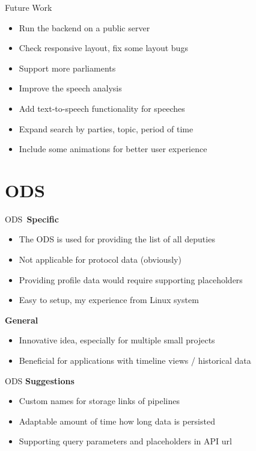\documentclass{beamer}
\begin{document}
  \begin{frame}[plain]{Future Work}
    \begin{itemize}
      \item[\footnotesize{\faWarning}]\enspace{}Run the backend on a public server
      \item[\footnotesize{\faWarning}]\enspace{}Check responsive layout, fix some layout bugs
      \item[\footnotesize{\faStar}]\enspace{}Support more parliaments
      \item[\footnotesize{\faStar}]\enspace{}Improve the speech analysis
      \item[\footnotesize{\faStar}]\enspace{}Add text-to-speech functionality for speeches
      \item[\footnotesize{\faStar}]\enspace{}Expand search by parties, topic, period of time 
      \item[\footnotesize{\faStar}]\enspace{}Include some animations for better user experience
    \end{itemize}
  \end{frame}

  \section{ODS}
  \begin{frame}[plain]{ODS}
    \,\textbf{\faUser}\quad\textbf{Specific}
    \begin{itemize}
      \item The ODS is used for providing the list of all deputies
      \item Not applicable for protocol data (obviously)
      \item Providing profile data would require supporting placeholders
      \item Easy to setup, my experience from Linux system
    \end{itemize}
    \textbf{\faUsers}\quad\textbf{General}
    \begin{itemize}
      \item Innovative idea, especially for multiple small projects
      \item Beneficial for applications with timeline views / historical data 
    \end{itemize} 
  \end{frame}

  \begin{frame}[plain]{ODS}
    \textbf{\faThumbsUp}\quad\textbf{Suggestions}
    \begin{itemize}
      \item Custom names for storage links of pipelines
      \item Adaptable amount of time how long data is persisted
      \item Supporting query parameters and placeholders in API url
    \end{itemize} 
  \end{frame}
\end{document}
